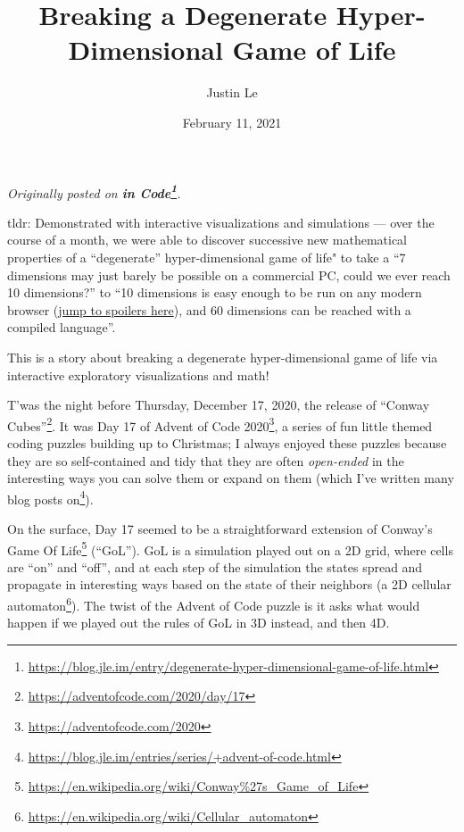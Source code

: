 \documentclass[]{article}
\title{Breaking a Degenerate Hyper-Dimensional Game of Life}
\author{Justin Le}
\date{February 11, 2021}
\renewcommand{\href}[2]{#2\footnote{\url{#1}}}
\begin{document}
\maketitle

\emph{Originally posted on
\textbf{\href{https://blog.jle.im/entry/degenerate-hyper-dimensional-game-of-life.html}{in
Code}}.}

tldr: Demonstrated with interactive visualizations and simulations --- over the
course of a month, we were able to discover successive new mathematical
properties of a ``degenerate'' hyper-dimensional game of life" to take a ``7
dimensions may just barely be possible on a commercial PC, could we ever reach
10 dimensions?'' to ``10 dimensions is easy enough to be run on any modern
browser (\protect\hyperlink{golFlat}{jump to spoilers here}), and 60 dimensions
can be reached with a compiled language''.

This is a story about breaking a degenerate hyper-dimensional game of life via
interactive exploratory visualizations and math!

T'was the night before Thursday, December 17, 2020, the release of
\href{https://adventofcode.com/2020/day/17}{``Conway Cubes''}. It was Day 17 of
\href{https://adventofcode.com/2020}{Advent of Code 2020}, a series of fun
little themed coding puzzles building up to Christmas; I always enjoyed these
puzzles because they are so self-contained and tidy that they are often
\emph{open-ended} in the interesting ways you can solve them or expand on them
(which I've written
\href{https://blog.jle.im/entries/series/+advent-of-code.html}{many blog posts
on}).

On the surface, Day 17 seemed to be a straightforward extension of
\href{https://en.wikipedia.org/wiki/Conway\%27s_Game_of_Life}{Conway's Game Of
Life} (``GoL''). GoL is a simulation played out on a 2D grid, where cells are
``on'' and ``off'', and at each step of the simulation the states spread and
propagate in interesting ways based on the state of their neighbors (a
\href{https://en.wikipedia.org/wiki/Cellular_automaton}{2D cellular automaton}).
The twist of the Advent of Code puzzle is it asks what would happen if we played
out the rules of GoL in 3D instead, and then 4D.
\end{document}
